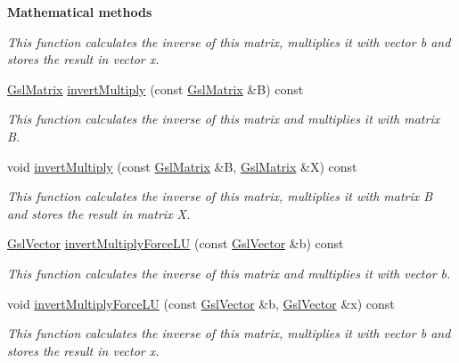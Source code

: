 \begin{Indent}{\bf Mathematical methods}
\begin{DoxyCompactItemize}
\begin{DoxyCompactList}\small\item\em This function calculates the inverse of {\ttfamily this} matrix, multiplies it with vector {\ttfamily b} and stores the result in vector {\ttfamily x}. \end{DoxyCompactList}\item 
\hyperlink{class_q_u_e_s_o_1_1_gsl_matrix}{Gsl\-Matrix} \hyperlink{class_q_u_e_s_o_1_1_gsl_matrix_acf38c265edb9aa769c997e39dc2a0fc6}{invert\-Multiply} (const \hyperlink{class_q_u_e_s_o_1_1_gsl_matrix}{Gsl\-Matrix} \&B) const 
\begin{DoxyCompactList}\small\item\em This function calculates the inverse of {\ttfamily this} matrix and multiplies it with matrix {\ttfamily B}. \end{DoxyCompactList}\item 
void \hyperlink{class_q_u_e_s_o_1_1_gsl_matrix_a9ab3664d29cdb20ff46ba05b9f993e4f}{invert\-Multiply} (const \hyperlink{class_q_u_e_s_o_1_1_gsl_matrix}{Gsl\-Matrix} \&B, \hyperlink{class_q_u_e_s_o_1_1_gsl_matrix}{Gsl\-Matrix} \&X) const 
\begin{DoxyCompactList}\small\item\em This function calculates the inverse of {\ttfamily this} matrix, multiplies it with matrix {\ttfamily B} and stores the result in matrix {\ttfamily X}. \end{DoxyCompactList}\item 
\hyperlink{class_q_u_e_s_o_1_1_gsl_vector}{Gsl\-Vector} \hyperlink{class_q_u_e_s_o_1_1_gsl_matrix_a1d2137ffe34ee2261d970db896d10ebd}{invert\-Multiply\-Force\-L\-U} (const \hyperlink{class_q_u_e_s_o_1_1_gsl_vector}{Gsl\-Vector} \&b) const 
\begin{DoxyCompactList}\small\item\em This function calculates the inverse of {\ttfamily this} matrix and multiplies it with vector {\ttfamily b}. \end{DoxyCompactList}\item 
void \hyperlink{class_q_u_e_s_o_1_1_gsl_matrix_a3e454b9f2e3d7852cefccd6e84b4d9f2}{invert\-Multiply\-Force\-L\-U} (const \hyperlink{class_q_u_e_s_o_1_1_gsl_vector}{Gsl\-Vector} \&b, \hyperlink{class_q_u_e_s_o_1_1_gsl_vector}{Gsl\-Vector} \&x) const 
\begin{DoxyCompactList}\small\item\em This function calculates the inverse of {\ttfamily this} matrix, multiplies it with vector {\ttfamily b} and stores the result in vector {\ttfamily x}. \end{DoxyCompactList}\item 

\end{DoxyCompactItemize}
\end{Indent}
